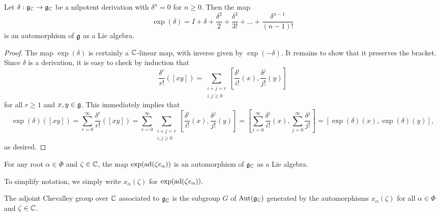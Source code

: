 \begin{proposition}
    Let $\delta:\mathfrak{g}_{\mathbb{C}}\to\mathfrak{g}_{\mathbb{C}}$ be a nilpotent derivation with $\delta^n=0$ for $n\geq 0$. Then the map $$\exp(\delta)=I+\delta+\frac{\delta^2}{2}+\frac{\delta^3}{3!}+\dots+\frac{\delta^{n-1}}{(n-1)!}$$
    is an automorphism of $\mathfrak{g}$ as a Lie algebra.
\end{proposition}
\begin{proof}
    The map $\exp(\delta)$ is certainly a $\mathbb{C}$-linear map, with inverse given by $\exp(-\delta)$. It remains to show that it preserves the bracket. Since $\delta$ is a derivation, it is easy to check by induction that 
    $$\frac{\delta^r}{r!}([xy])=\sum_{\substack{i+j=r \\ i,j\geq 0}}\left[\frac{\delta^i}{i!}(x),\frac{\delta^{j}}{j!}(y)\right]$$ 
    for all $r\geq 1$ and $x,y\in\mathfrak{g}$. This immediately implies that
    $$\exp(\delta)([xy])=\sum_{r=0}^{\infty}\frac{\delta^r}{r!}([xy])=\sum_{r=0}^{\infty}\sum_{\substack{i+j=r \\ i,j\geq 0}}\left[\frac{\delta^i}{i!}(x),\frac{\delta^{j}}{j!}(y)\right]=\left[\sum_{i=0}^\infty\frac{\delta^i}{i!}(x),\sum_{j=0}^{\infty}\frac{\delta^j}{j!}\right]=[\exp(\delta)(x),\exp(\delta)(y)],$$
    as desired.
\end{proof}

\begin{cor}\label{cor:xalpha_automorphism}
    For any root $\alpha\in\Phi$ and $\zeta\in \mathbb{C}$, the map $\exp(\mathrm{ad}(\zeta e_\alpha))$ is an automorphism of $\fg_\CC$ as a Lie algebra.
\end{cor}

To simplify notation, we simply write $x_\alpha(\zeta)$ for $\exp(\mathrm{ad}(\zeta e_\alpha))$. 
\iffalse In addition, for any $\chi\in\Hom(\ZZ\Phi,\CC^*)$, we define the automorphism of $\fg_\CC$ given by
\begin{align*}
    h(\chi):\fg_\CC & \longrightarrow\fg_\CC  \\
    h_i & \longmapsto h_i\quad\quad\quad\text{ for all }1\leq i\leq n,\\
    e_\alpha &\longmapsto \chi(\alpha)e_\alpha\quad \text{ for all }\alpha\in\Phi.
\end{align*}
The fact that $\chi$ is a multiplicative character implies that $h(\chi)$ is a Lie algebra automorphism of $\fg_\CC$. \fi

\begin{definition}\label{def:complexchevgroup}
    The adjoint Chevalley group over $\mathbb{C}$ associated to $\fg_\CC$ is the subgroup $G$ of $\mathrm{Aut}(\mathfrak{g}_{\mathbb{C}})$ generated by the automorphisms $x_\alpha(\zeta)$ for all $\alpha\in\Phi$ and $\zeta\in\mathbb{C}$.
    \iffalse
    $$\text{  and  }\{h(\chi):\chi\in\Hom(\ZZ\Phi,\CC^*)\}.$$
    \fi
\end{definition}

